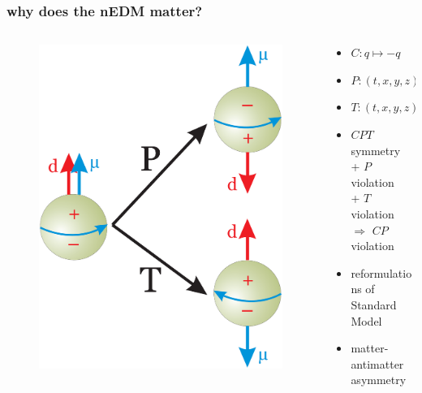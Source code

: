 \documentclass[handout]{beamer}
\begin{document}
\begin{frame}
\frametitle{why does the nEDM matter?}

    \begin{columns}
    
    \begin{column}{0.4\textwidth}
    \begin{figure}
    \includegraphics[width=\textwidth]{figures/nEDM_P_T_violation.png}
    \end{figure}
    \end{column}
   
    \begin{column}{0.6\textwidth}
    \begin{itemize}
        \item $C: q \mapsto -q$ \pause
        \item $P: (t, x, y, z) \mapsto (t, x, -y, z)$ \pause
        \item $T: (t, x, y, z) \mapsto (-t, x, y, z)$ \pause
        \bigskip
        \item $CPT$ symmetry \\\pause + $P$ violation \\\pause + $T$ violation \\
        \pause $\Rightarrow$ $CP$ violation \pause
        \bigskip
        \item reformulations of Standard Model
        \item matter-antimatter asymmetry
    \end{itemize}
    \end{column}


\end{columns}
\end{frame}
\end{document}
